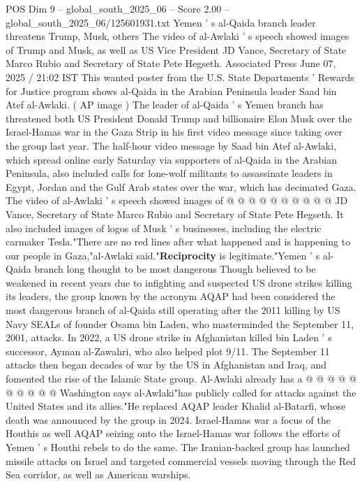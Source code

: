 \begin{textsample}{POS Dim 9 – global\_south\_2025\_06 – Score 2.00 – global\_south\_2025\_06/125601931.txt}  \label{ex:f9_pos_185}
Yemen ' s al-Qaida branch leader threatens Trump, Musk, others The video of al-Awlaki ' s speech showed images of Trump and Musk, as well as US Vice President JD Vance, Secretary of State Marco Rubio and Secretary of State Pete Hegseth.
Associated Press June 07, 2025 / 21:02 IST This wanted poster from the U.S.
State Departments ' Rewards for Justice program shows al-Qaida in the Arabian Peninsula leader Saad bin Atef al-Awlaki. ( AP image ) The leader of al-Qaida ' s Yemen branch has threatened both US President Donald Trump and billionaire Elon Musk over the Israel-Hamas war in the Gaza Strip in his first video message since taking over the group last year.
The half-hour video message by Saad bin Atef al-Awlaki, which spread online early Saturday via supporters of al-Qaida in the Arabian Peninsula, also included calls for lone-wolf militants to assassinate leaders in Egypt, Jordan and the Gulf Arab states over the war, which has decimated Gaza.
The video of al-Awlaki ' s speech showed images of @ @ @ @ @ @ @ @ @ @ JD Vance, Secretary of State Marco Rubio and Secretary of State Pete Hegseth.
It also included images of logos of Musk ' s businesses, including the electric carmaker Tesla."There are no red lines after what happened and is happening to our people in Gaza,"al-Awlaki said."\textbf{Reciprocity} is legitimate."Yemen ' s al-Qaida branch long thought to be most dangerous Though believed to be weakened in recent years due to infighting and suspected US drone strikes killing its leaders, the group known by the acronym AQAP had been considered the most dangerous branch of al-Qaida still operating after the 2011 killing by US Navy SEALs of founder Osama bin Laden, who masterminded the September 11, 2001, attacks.
In 2022, a US drone strike in Afghanistan killed bin Laden ' s successor, Ayman al-Zawahri, who also helped plot 9/11.
The September 11 attacks then began decades of war by the US in Afghanistan and Iraq, and fomented the rise of the Islamic State group.
Al-Awlaki already has a @ @ @ @ @ @ @ @ @ @ Washington says al-Awlaki"has publicly called for attacks against the United States and its allies."He replaced AQAP leader Khalid al-Batarfi, whose death was announced by the group in 2024.
Israel-Hamas war a focus of the Houthis as well AQAP seizing onto the Israel-Hamas war follows the efforts of Yemen ' s Houthi rebels to do the same.
The Iranian-backed group has launched missile attacks on Israel and targeted commercial vessels moving through the Red Sea corridor, as well as American warships.

\end{textsample}
